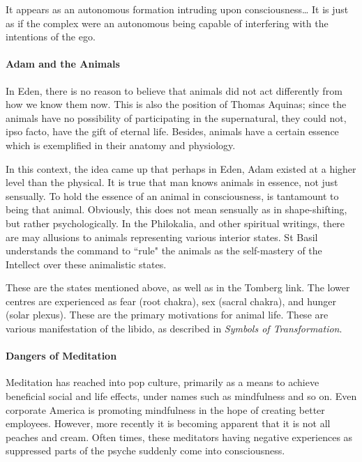 \begin{quotex}
It appears as an autonomous formation intruding upon consciousness… It is just as if the complex were an autonomous
being capable of interfering with the intentions of the ego. 

\end{quotex}
\paragraph{Adam and the Animals}
In Eden, there is no reason to believe that animals did not act differently from how we know them now. This is also the
position of Thomas Aquinas; since the animals have no possibility of participating in the supernatural, they could not,
ipso facto, have the gift of eternal life. Besides, animals have a certain essence which is exemplified in their
anatomy and physiology.

In this context, the idea came up that perhaps in Eden, Adam existed at a higher level than the physical. It is true
that man knows animals in essence, not just sensually. To hold the essence of an animal in consciousness, is tantamount
to being that animal. Obviously, this does not mean sensually as in shape-shifting, but rather psychologically. In the
Philokalia, and other spiritual writings, there are may allusions to animals representing various interior states. St
Basil understands the command to ``rule" the animals as the self-mastery of the Intellect over these animalistic states.

These are the states mentioned above, as well as in the Tomberg link. The lower centres are experienced as fear (root
chakra), sex (sacral chakra), and hunger (solar plexus). These are the primary motivations for animal life. These are
various manifestation of the libido, as described in \emph{Symbols of Transformation}.

\paragraph{Dangers of Meditation}
Meditation has reached into pop culture, primarily as a means to achieve beneficial social and life effects, under names
such as mindfulness and so on. Even corporate America is promoting mindfulness in the hope of creating better
employees. However, more recently it is becoming apparent that it is not all peaches and cream. Often times, these
meditators having negative experiences as suppressed parts of the psyche suddenly come into consciousness.

